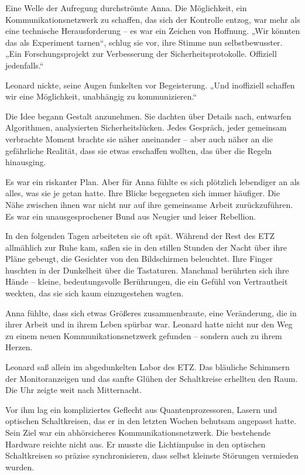 \documentclass[
]{article}
\begin{document}
Eine Welle der Aufregung durchströmte Anna. Die Möglichkeit, ein Kommunikationsnetzwerk zu schaffen, das sich der Kontrolle entzog, war mehr als eine technische Herausforderung -- es war ein Zeichen von Hoffnung. „Wir könnten das als Experiment tarnen``, schlug sie vor, ihre Stimme nun selbstbewusster. „Ein Forschungsprojekt zur Verbesserung der Sicherheitsprotokolle. Offiziell jedenfalls.``

Leonard nickte, seine Augen funkelten vor Begeisterung. „Und inoffiziell schaffen wir eine Möglichkeit, unabhängig zu kommunizieren.``

Die Idee begann Gestalt anzunehmen. Sie dachten über Details nach, entwarfen Algorithmen, analysierten Sicherheitslücken. Jedes Gespräch, jeder gemeinsam verbrachte Moment brachte sie näher aneinander -- aber auch näher an die gefährliche Realität, dass sie etwas erschaffen wollten, das über die Regeln hinausging.

Es war ein riskanter Plan. Aber für Anna fühlte es sich plötzlich lebendiger an als alles, was sie je getan hatte. Ihre Blicke begegneten sich immer häufiger. Die Nähe zwischen ihnen war nicht nur auf ihre gemeinsame Arbeit zurückzuführen. Es war ein unausgesprochener Bund aus Neugier und leiser Rebellion.

In den folgenden Tagen arbeiteten sie oft spät. Während der Rest des ETZ allmählich zur Ruhe kam, saßen sie in den stillen Stunden der Nacht über ihre Pläne gebeugt, die Gesichter von den Bildschirmen beleuchtet. Ihre Finger huschten in der Dunkelheit über die Tastaturen. Manchmal berührten sich ihre Hände -- kleine, bedeutungsvolle Berührungen, die ein Gefühl von Vertrautheit weckten, das sie sich kaum einzugestehen wagten.

Anna fühlte, dass sich etwas Größeres zusammenbraute, eine Veränderung, die in ihrer Arbeit und in ihrem Leben spürbar war. Leonard hatte nicht nur den Weg zu einem neuen Kommunikationsnetzwerk gefunden -- sondern auch zu ihrem Herzen.

Leonard saß allein im abgedunkelten Labor des ETZ. Das bläuliche Schimmern der Monitoranzeigen und das sanfte Glühen der Schaltkreise erhellten den Raum. Die Uhr zeigte weit nach Mitternacht.

Vor ihm lag ein kompliziertes Geflecht aus Quantenprozessoren, Lasern und optischen Schaltkreisen, das er in den letzten Wochen behutsam angepasst hatte. Sein Ziel war ein abhörsicheres Kommunikationsnetzwerk. Die bestehende Hardware reichte nicht aus. Er musste die Lichtimpulse in den optischen Schaltkreisen so präzise synchronisieren, dass selbst kleinste Störungen vermieden wurden.
\end{document}
